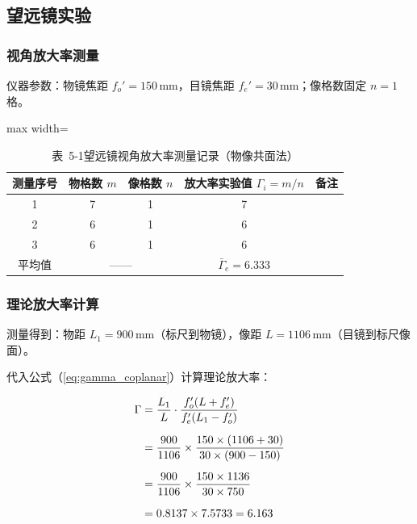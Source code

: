 \documentclass[12pt, a4paper]{article}
\begin{document}
\subsection{望远镜实验}

\subsubsection{视角放大率测量}

仪器参数：物镜焦距 $f_o'=150\,\text{mm}$，目镜焦距 $f_e'=30\,\text{mm}$；像格数固定 $n=1$ 格。

\begin{table}[H]
  \caption{表~5-1\quad 望远镜视角放大率测量记录（物像共面法）}
  \label{tab:telescope}
  \centering
  \begin{adjustbox}{max width=\textwidth}
    \begin{tabular}{ccccc}
      \toprule
      测量序号 & 物格数 $m$ & 像格数 $n$ & 放大率实验值 $\Gamma_i = m/n$ & 备注 \\
      \midrule
      1 & 7 & 1 & 7 & \\
      2 & 6 & 1 & 6 & \\
      3 & 6 & 1 & 6 & \\
      \midrule
      平均值 & \multicolumn{2}{c}{——} & $\bar{\Gamma}_e = 6.333$ & \\
      \bottomrule
    \end{tabular}
  \end{adjustbox}
\end{table}

\subsubsection{理论放大率计算}

测量得到：物距 $L_1 = 900\,\text{mm}$（标尺到物镜），像距 $L = 1106\,\text{mm}$（目镜到标尺像面）。

代入公式（\ref{eq:gamma_coplanar}）计算理论放大率：

\begin{align}
  \Gamma &= \frac{L_1}{L}\cdot\frac{f_o'(L+f_e')}{f_e'(L_1-f_o')} \notag\\[6pt]
         &= \frac{900}{1106}\times\frac{150\times(1106+30)}{30\times(900-150)} \notag\\[6pt]
         &= \frac{900}{1106}\times\frac{150\times 1136}{30\times 750} \notag\\[6pt]
         &= 0.8137\times 7.5733 = 6.163
  \label{eq:telescope_theory}
\end{align}
\end{document}
